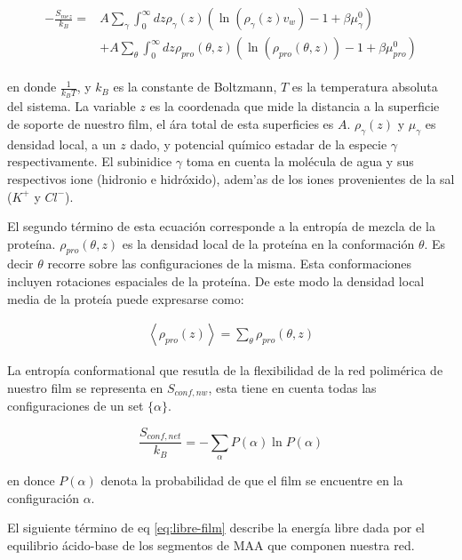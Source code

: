 \begin{align}
	\begin{aligned}
		-\frac{S_{mez}}{k_B}= &A\sum_{\gamma}\int_0^\infty{dz\rho_\gamma(z)\left(\ln \left(\rho_\gamma (z)v_w\right) -1 + \beta\mu^0_\gamma\right)} \\
		&+ A\sum_{\theta}\int_0^\infty{dz\rho_{pro}(\theta,z)\left(\ln \left(\rho_{pro}(\theta,z)\right) -1 + \beta\mu^0_{pro} \right)}
	\end{aligned}
\end{align}

\noindent en donde $\frac{1}{k_B T}$, y $k_B$ es la constante de Boltzmann, $T$ es la temperatura absoluta del sistema. La variable $z$ es la coordenada que mide la distancia a la superficie de soporte de nuestro film, el \'ara total de esta superficies es $A$. $\rho_\gamma(z)$ y $\mu_\gamma$ es densidad local, a un $z$ dado, y potencial qu\'imico estadar de la especie $\gamma$ respectivamente.
El subinidice $\gamma$ toma en cuenta la mol\'ecula de agua y sus respectivos ione (hidronio e hidr\'oxido), adem'as de los iones provenientes de la sal ($K^+$ y $Cl^-$). 


El segundo t\'ermino de esta ecuaci\'on corresponde a la entrop\'ia de mezcla de la prote\'ina. $\rho_{pro}(\theta,z)$ es la densidad local de la prote\'ina en la conformaci\'on $\theta$. Es decir $\theta$ recorre sobre las configuraciones de la misma.
Esta conformaciones incluyen rotaciones espaciales de la prote\'ina.
De este modo la densidad local media de la prote\'ia puede expresarse como:


\begin{align}
	\left<\rho_{pro}(z)\right> = \sum_\theta{\rho_{pro}(\theta,z)}
\end{align}


La entrop\'ia conformational que resutla de la flexibilidad de la red polim\'erica de nuestro film se representa en $S_{conf, nw}$, esta tiene en cuenta todas las configuraciones de un set $\{\alpha\}$.

\begin{equation}
	\frac{S_{conf,net}}{k_B} = - \sum_{\alpha}{P(\alpha)\ln P(\alpha)}
\end{equation}

\noindent en donce $P(\alpha)$ denota la probabilidad de que el film se encuentre en la configuraci\'on $\alpha$.

El siguiente t\'ermino de eq \ref{eq:libre-film} describe  la energ\'ia libre dada por  el equilibrio \'acido-base de los segmentos de MAA que componen nuestra red. 

